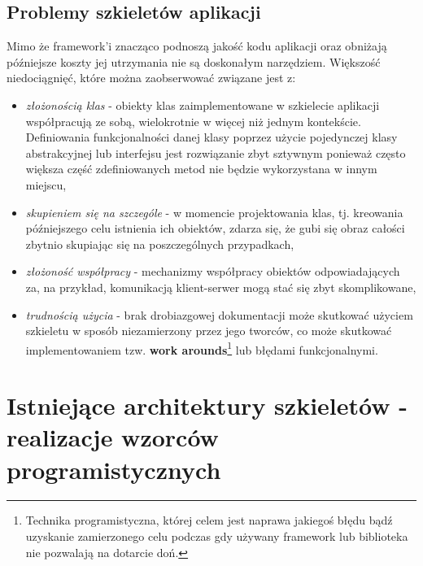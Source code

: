 	\subsection{Problemy szkieletów aplikacji}
	Mimo że framework'i znacząco podnoszą jakość kodu aplikacji oraz obniżają późniejsze koszty jej utrzymania nie są doskonałym
	narzędziem. Większość niedociągnięć, które można zaobserwować związane jest z:
	\begin{itemize}
		\item \textit{złożonością klas} - obiekty klas zaimplementowane w szkielecie aplikacji współpracują ze sobą, wielokrotnie w
		więcej niż jednym kontekście. Definiowania funkcjonalności danej klasy poprzez użycie pojedynczej klasy abstrakcyjnej lub
		interfejsu jest rozwiązanie zbyt sztywnym ponieważ często większa część zdefiniowanych metod nie będzie wykorzystana 
		w innym miejscu,
		\item \textit{skupieniem się na szczególe} - w momencie projektowania klas, tj. kreowania późniejszego celu istnienia 
		ich obiektów, zdarza się, że gubi się obraz całości zbytnio skupiając się na poszczególnych przypadkach, 
		\item \textit{złożoność współpracy} - mechanizmy współpracy obiektów odpowiadających za, na przykład, komunikacją klient-serwer
		mogą stać się zbyt skomplikowane,
		\item \textit{trudnością użycia} - brak drobiazgowej dokumentacji może skutkować użyciem szkieletu w sposób niezamierzony przez
		jego tworców, co może skutkować implementowaniem tzw. \textbf{work arounds}\footnote{Technika programistyczna, której celem jest
		naprawa jakiegoś błędu bądź uzyskanie zamierzonego celu podczas gdy używany framework lub biblioteka nie pozwalają na dotarcie
		doń.} lub błędami funkcjonalnymi\cite{framework_design_-_a_role_modeling_approach}. 
	\end{itemize}
	
\section{Istniejące architektury szkieletów - realizacje wzorców programistycznych}
	